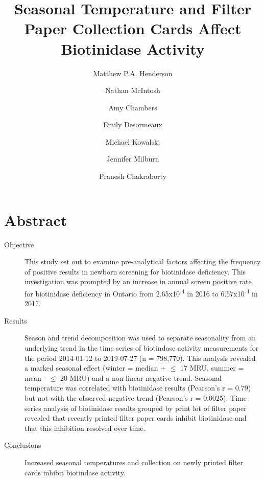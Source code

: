 \documentclass[review]{elsarticle}
\date{}
\title{}
\begin{document}
\makeatletter
\newcommand{\citeprocitem}[2]{\hyper@linkstart{cite}{citeproc_bib_item_#1}#2\hyper@linkend}
\makeatother



\begin{frontmatter}
\title{Seasonal Temperature and Filter Paper Collection Cards Affect Biotinidase Activity}
\author[NSO, UoO]{Matthew P.A. Henderson}
\author[NSO]{Nathan McIntosh}
\author[NSO]{Amy Chambers}
\author[NSO]{Emily Desormeaux}
\author[NSO]{Michael Kowalski}
\author[NSO]{Jennifer Milburn}
\author[NSO, UO]{Pranesh Chakraborty}
\address[NSO]{Newborn Screening Ontario, Children's Hospital of Eastern Ontario}
\address[UoO]{Department of Medicine, University of Ottawa} 
\end{frontmatter}

\section*{Abstract}
\label{sec:org41d890b}
\begin{description}
\item[{Objective}] This study set out to examine pre-analytical factors
affecting the frequency of positive results in newborn screening for
biotinidase deficiency. This investigation was prompted by an
increase in annual screen positive rate for biotinidase deficiency
in Ontario from 2.65x10\textsuperscript{-4} in 2016 to 6.57x10\textsuperscript{-4} in 2017.

\item[{Results}] Season and trend decomposition was used to separate
seasonality from an underlying trend in the time series of
biotindase activity measurements for the period 2014-01-12 to
2019-07-27 (n = 798,770). This analysis revealed a marked seasonal
effect (winter = median + \(\le\) 17 MRU, summer = mean - \(\le\) 20 MRU)
and a non-linear negative trend. Seasonal temperature was correlated
with biotinidase results (Pearson's r = 0.79) but not with the
observed negative trend (Pearson's r = 0.0025). Time series analysis
of biotinidase results grouped by print lot of filter paper revealed
that recently printed filter paper cards inhibit biotinidase and
that this inhibition resolved over time.

\item[{Conclusions}] Increased seasonal temperatures and collection on
newly printed filter cards inhibit biotindase activity.
\end{description}
\end{document}
